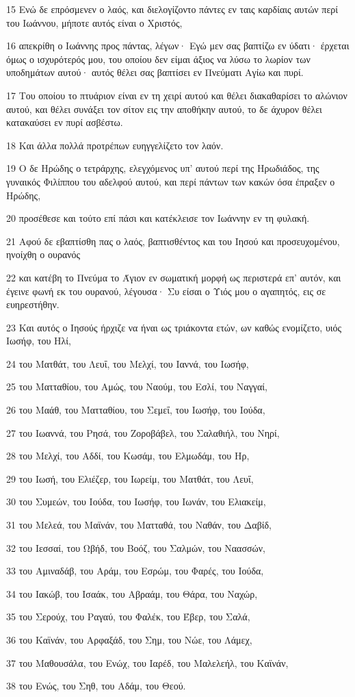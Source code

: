 \par 15 Ενώ δε επρόσμενεν ο λαός, και διελογίζοντο πάντες εν ταις καρδίαις αυτών περί του Ιωάννου, μήποτε αυτός είναι ο Χριστός,
\par 16 απεκρίθη ο Ιωάννης προς πάντας, λέγων· Εγώ μεν σας βαπτίζω εν ύδατι· έρχεται όμως ο ισχυρότερός μου, του οποίου δεν είμαι άξιος να λύσω το λωρίον των υποδημάτων αυτού· αυτός θέλει σας βαπτίσει εν Πνεύματι Αγίω και πυρί.
\par 17 Του οποίου το πτυάριον είναι εν τη χειρί αυτού και θέλει διακαθαρίσει το αλώνιον αυτού, και θέλει συνάξει τον σίτον εις την αποθήκην αυτού, το δε άχυρον θέλει κατακαύσει εν πυρί ασβέστω.
\par 18 Και άλλα πολλά προτρέπων ευηγγελίζετο τον λαόν.
\par 19 Ο δε Ηρώδης ο τετράρχης, ελεγχόμενος υπ' αυτού περί της Ηρωδιάδος, της γυναικός Φιλίππου του αδελφού αυτού, και περί πάντων των κακών όσα έπραξεν ο Ηρώδης,
\par 20 προσέθεσε και τούτο επί πάσι και κατέκλεισε τον Ιωάννην εν τη φυλακή.
\par 21 Αφού δε εβαπτίσθη πας ο λαός, βαπτισθέντος και του Ιησού και προσευχομένου, ηνοίχθη ο ουρανός
\par 22 και κατέβη το Πνεύμα το Άγιον εν σωματική μορφή ως περιστερά επ' αυτόν, και έγεινε φωνή εκ του ουρανού, λέγουσα· Συ είσαι ο Υιός μου ο αγαπητός, εις σε ευηρεστήθην.
\par 23 Και αυτός ο Ιησούς ήρχιζε να ήναι ως τριάκοντα ετών, ων καθώς ενομίζετο, υιός Ιωσήφ, του Ηλί,
\par 24 του Ματθάτ, του Λευΐ, του Μελχί, του Ιαννά, του Ιωσήφ,
\par 25 του Ματταθίου, του Αμώς, του Ναούμ, του Εσλί, του Ναγγαί,
\par 26 του Μαάθ, του Ματταθίου, του Σεμεΐ, του Ιωσήφ, του Ιούδα,
\par 27 του Ιωαννά, του Ρησά, του Ζοροβάβελ, του Σαλαθιήλ, του Νηρί,
\par 28 του Μελχί, του Αδδί, του Κωσάμ, του Ελμωδάμ, του Ηρ,
\par 29 του Ιωσή, του Ελιέζερ, του Ιωρείμ, του Ματθάτ, του Λευΐ,
\par 30 του Συμεών, του Ιούδα, του Ιωσήφ, του Ιωνάν, του Ελιακείμ,
\par 31 του Μελεά, του Μαϊνάν, του Ματταθά, του Ναθάν, του Δαβίδ,
\par 32 του Ιεσσαί, του Ωβήδ, του Βοόζ, του Σαλμών, του Ναασσών,
\par 33 του Αμιναδάβ, του Αράμ, του Εσρώμ, του Φαρές, του Ιούδα,
\par 34 του Ιακώβ, του Ισαάκ, του Αβραάμ, του Θάρα, του Ναχώρ,
\par 35 του Σερούχ, του Ραγαύ, του Φαλέκ, του Έβερ, του Σαλά,
\par 36 του Καϊνάν, του Αρφαξάδ, του Σημ, του Νώε, του Λάμεχ,
\par 37 του Μαθουσάλα, του Ενώχ, του Ιαρέδ, του Μαλελεήλ, του Καϊνάν,
\par 38 του Ενώς, του Σηθ, του Αδάμ, του Θεού.

